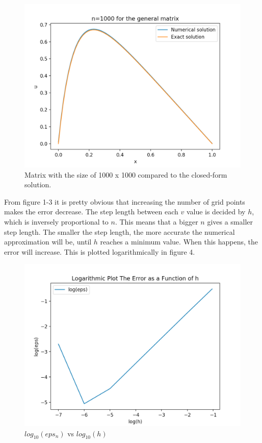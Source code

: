 \documentclass[%
oneside,                 %
final,                   %
10pt]{article}
\begin{document}
\begin{figure}[H]
  \includegraphics[scale=0.5]{figur1b_1000.png}
  \caption{Matrix with the size of 1000 x 1000 compared to the closed-form solution.}
  \label{1b_1000}
\end{figure}
\newpage{}

From figure 1-3 it is pretty obvious that increasing the number of grid points makes the error decrease. The step length between each $v$ value is decided by $h$, which is inversely proportional to $n$. This means that a bigger $n$ gives a smaller step length. The smaller the step length, the more accurate the numerical approximation will be, until $h$ reaches a minimum value. When this happens, the error will increase. This is plotted logarithmically in figure 4.

\begin{figure}[H]
  \includegraphics[scale=0.5]{fig-error.png}
  \caption{$log_{10}(eps_n)$ vs $log_{10}(h)$}
  \label{1d}
\end{figure}
\end{document}
